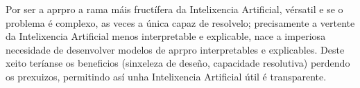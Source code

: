 Por ser a \acrshort{aprpro} a rama máis fructífera da Intelixencia Artificial, vérsatil e se o problema é complexo, as veces a única capaz de resolvelo; precisamente a vertente da Intelixencia Artificial menos interpretable e explicable, nace a imperiosa necesidade de desenvolver modelos de \acrshort{aprpro} interpretables e explicables. Deste xeito teríanse os beneficios (sinxeleza de deseño, capacidade resolutiva) perdendo os prexuizos, permitindo así unha Intelixencia Artificial útil é transparente.

%
%
%
%
%

